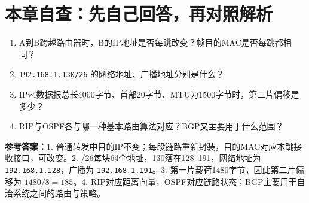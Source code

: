 \section*{本章自查：先自己回答，再对照解析}
\begin{enumerate}[nosep]
\item A到B跨越路由器时，B的IP地址是否每跳改变？帧目的MAC是否每跳都相同？
\item \texttt{192.168.1.130/26} 的网络地址、广播地址分别是什么？
\item IPv4数据报总长4000字节、首部20字节、MTU为1500字节时，第二片偏移是多少？
\item RIP与OSPF各与哪一种基本路由算法对应？BGP又主要用于什么范围？
\end{enumerate}
\textbf{参考答案：}1. 普通转发中目的IP不变；每段链路重新封装，目的MAC对应本跳接收接口，可改变。2. /26每块64个地址，130落在128--191，网络地址为 \texttt{192.168.1.128}，广播为 \texttt{192.168.1.191}。3. 第一片载荷1480字节，因此第二片偏移为 $1480/8=185$。4. RIP对应距离向量，OSPF对应链路状态；BGP主要用于自治系统之间的路由与策略。
\annotationarea[2]

